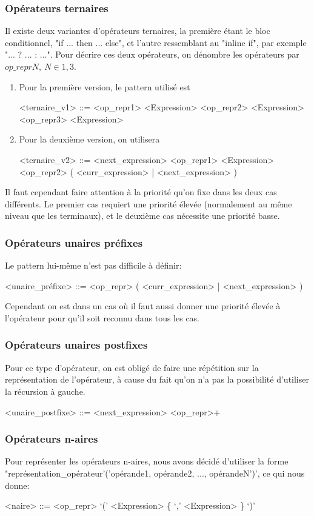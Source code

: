 \documentclass{article}
\begin{document}
\subsubsection{Opérateurs ternaires}
Il existe deux variantes d'opérateurs ternaires, la première étant le bloc conditionnel, "if ... then ... else", et l'autre ressemblant au "inline if", par exemple "... ? ... : ...". Pour décrire ces deux opérateurs, on dénombre les opérateurs par $op\_reprN, \ N \in {1, 3}$.
\begin{enumerate}
	\item Pour la première version, le pattern utilisé est 
	\begin{grammar}
		<ternaire\_v1> ::= <op\_repr1> <Expression> <op\_repr2> <Expression> <op\_repr3> <Expression>
	\end{grammar}
	\item Pour la deuxième version, on utilisera
	\begin{grammar}
		<ternaire\_v2> ::= <next\_expression> <op\_repr1> <Expression> <op\_repr2> ( <curr\_expression> | <next\_expression> )
	\end{grammar}
\end{enumerate}
Il faut cependant faire attention à la priorité qu'on fixe dans les deux cas différents. Le premier cas requiert une priorité élevée (normalement au même niveau que les terminaux), et le deuxième cas nécessite une priorité basse.
\subsubsection{Opérateurs unaires préfixes}
Le pattern lui-même n'est pas difficile à définir:
\begin{grammar}
	<unaire\_préfixe> ::= <op\_repr> ( <curr\_expression> | <next\_expression> )
\end{grammar}
Cependant on est dans un cas où il faut aussi donner une priorité élevée à l'opérateur pour qu'il soit reconnu dans tous les cas.
\subsubsection{Opérateurs unaires postfixes}
Pour ce type d'opérateur, on est obligé de faire une répétition sur la représentation de l'opérateur, à cause du fait qu'on n'a pas la possibilité d'utiliser la récursion à gauche.
\begin{grammar}
	<unaire\_postfixe> ::= <next\_expression> <op\_repr>+
\end{grammar}
\subsubsection{Opérateurs n-aires}
Pour représenter les opérateurs n-aires, nous avons décidé d'utiliser la forme "représentation\_opérateur'('opérande1, opérande2, ..., opérandeN')', ce qui nous donne:
\begin{grammar}
	<naire> ::= <op\_repr> `(' <Expression> \{ `,' <Expression> \} `)'
\end{grammar}
\end{document}
